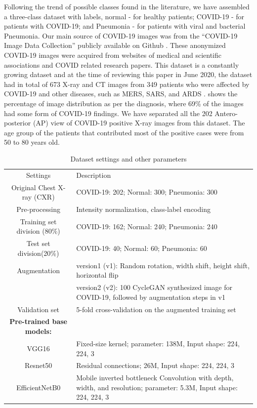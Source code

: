 Following the trend of possible classes found in the literature, we have assembled a three-class dataset with labels,  normal - for healthy patients;  COVID-19 - for patients with COVID-19; and Pneumonia - for patients with viral and bacterial Pneumonia. Our main source of COVID-19 images was from the “COVID-19 Image Data Collection”  publicly available on Github \cite{cohen2020covid}. These anonymized COVID-19 images were acquired from websites of medical and scientific associations and COVID related research papers. This dataset is a constantly growing dataset and at the time of reviewing this paper in June 2020, the dataset had in total of 673 X-ray and CT images from 349 patients who were affected by COVID-19 and other diseases, such as MERS, SARS, and ARDS \cite{araujo2020covid}.  shows the percentage of image distribution as per the diagnosis, where 69\% of the images had some form of COVID-19 findings. We have separated all the 202 Antero-posterior (AP) view of COVID-19 positive X-ray images from this dataset. The age group of the patients that contributed most of the positive cases were from 50 to 80 years old.

\begin{table}{
\centering
\caption{Dataset settings and other parameters }\label{data}
\begin{tabularx}{0.95\textwidth}{c X}
\toprule
Settings & Description\\
\otoprule
Original Chest X-ray (CXR)& COVID-19: 202; Normal: 300; Pneumonia: 300 \\
Pre-processing & Intensity normalization, class-label encoding  \\
Training set division (80\%)& COVID-19: 162; Normal: 240; Pneumonia: 240 \\
Test set division(20\%)&COVID-19: 40; Normal: 60; Pneumonia: 60 \\
Augmentation & version1 (v1): Random rotation, width shift, height shift, horizontal flip\\
 & version2 (v2): 100 CycleGAN  synthesized image for COVID-19, followed by augmentation steps in v1 \\
Validation set & 5-fold cross-validation on the augmented training set\\
\hline
\bf{Pre-trained base models:} & \\
VGG16& Fixed-size kernel; parameter: 138M, Input shape: 224, 224, 3\\
Resnet50\cite{he2016deep}  &Residual connections; 26M, Input shape: 224, 224, 3 \\
EfficientNetB0 \cite{tan2019efficientnet}& Mobile inverted bottleneck Convolution with depth, width, and resolution; parameter: 5.3M, Input shape:  224, 224, 3\\

\bottomrule
\end{tabularx}}
\end{table}

